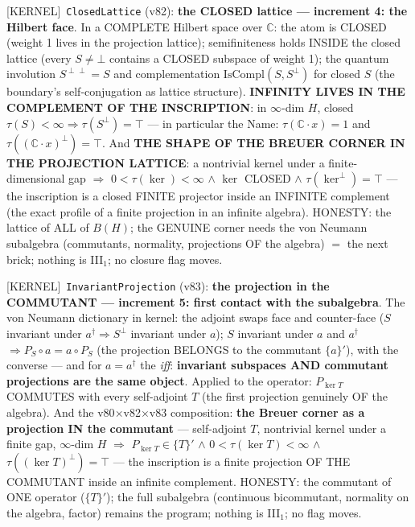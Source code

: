 \documentclass[11pt]{article}
\providecommand{\kernelmk}[1]{\textsf{[KERNEL]}~\texttt{#1}}\providecommand{\knownmk}[1]{\textsf{[KNOWN]}~{#1}}\providecommand{\statusmk}[1]{\textsf{[#1]}}
\theoremstyle{definition}\newtheorem{deriv}{Derivation}
\begin{document}
\kernelmk{ClosedLattice} (v82): \textbf{the CLOSED lattice --- increment 4: the Hilbert face}. In a COMPLETE Hilbert space over $\mathbb C$: the atom is CLOSED (weight 1 lives in the projection lattice); semifiniteness holds INSIDE the closed lattice (every $S\neq\bot$ contains a CLOSED subspace of weight 1); the quantum involution $S^{\perp\perp}=S$ and complementation $\mathrm{IsCompl}(S,S^\perp)$ for closed $S$ (the boundary's self-conjugation as lattice structure). \textbf{INFINITY LIVES IN THE COMPLEMENT OF THE INSCRIPTION}: in $\infty$-dim $H$, closed $\tau(S)<\infty\Rightarrow\tau(S^\perp)=\top$ --- in particular the Name: $\tau(\mathbb C\!\cdot\!x)=1$ and $\tau((\mathbb C\!\cdot\!x)^\perp)=\top$. And \textbf{THE SHAPE OF THE BREUER CORNER IN THE PROJECTION LATTICE}: a nontrivial kernel under a finite-dimensional gap $\Rightarrow$ $0<\tau(\ker)<\infty$ $\wedge$ $\ker$ CLOSED $\wedge$ $\tau(\ker^\perp)=\top$ --- the inscription is a closed FINITE projector inside an INFINITE complement (the exact profile of a finite projection in an infinite algebra). HONESTY: the lattice of ALL of $B(H)$; the GENUINE corner needs the von Neumann subalgebra (commutants, normality, projections OF the algebra) $=$ the next brick; nothing is III$_1$; no closure flag moves.

\kernelmk{InvariantProjection} (v83): \textbf{the projection in the COMMUTANT --- increment 5: first contact with the subalgebra}. The von Neumann dictionary in kernel: the adjoint swaps face and counter-face ($S$ invariant under $a^\dagger\Rightarrow S^\perp$ invariant under $a$); $S$ invariant under $a$ and $a^\dagger$ $\Rightarrow P_S\circ a=a\circ P_S$ (the projection BELONGS to the commutant $\{a\}'$), with the converse --- and for $a=a^\dagger$ the \emph{iff}: \textbf{invariant subspaces AND commutant projections are the same object}. Applied to the operator: $P_{\ker T}$ COMMUTES with every self-adjoint $T$ (the first projection genuinely OF the algebra). And the v80$\times$v82$\times$v83 composition: \textbf{the Breuer corner as a projection IN the commutant} --- self-adjoint $T$, nontrivial kernel under a finite gap, $\infty$-dim $H$ $\Rightarrow$ $P_{\ker T}\in\{T\}'$ $\wedge$ $0<\tau(\ker T)<\infty$ $\wedge$ $\tau((\ker T)^\perp)=\top$ --- the inscription is a finite projection OF THE COMMUTANT inside an infinite complement. HONESTY: the commutant of ONE operator ($\{T\}'$); the full subalgebra (continuous bicommutant, normality on the algebra, factor) remains the program; nothing is III$_1$; no flag moves.
\end{document}
